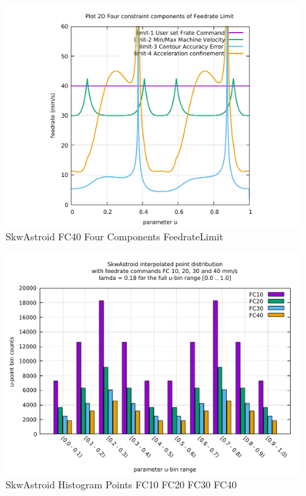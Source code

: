 \begin{figure}
	\caption     {SkwAstroid FC40 Four Components FeedrateLimit}
	\label{34-img-SkwAstroid-FC40-Four-Components-FeedrateLimit.pdf}
	\includegraphics[width=1.00\textwidth]{Chap4/appendix/app-SkwAstroid/plots/34-img-SkwAstroid-FC40-Four-Components-FeedrateLimit.pdf}
\end{figure}


\clearpage
\pagebreak

\begin{figure}
	\centering
	\caption     {SkwAstroid Histogram Points FC10 FC20 FC30 FC40}
	\label{35-img-SkwAstroid-Histogram-Points-FC10-FC20-FC30-FC40.pdf}
\includegraphics[width=1.00\textwidth]{Chap4/appendix/app-SkwAstroid/plots/35-img-SkwAstroid-Histogram-Points-FC10-FC20-FC30-FC40.pdf} 
\end{figure}


